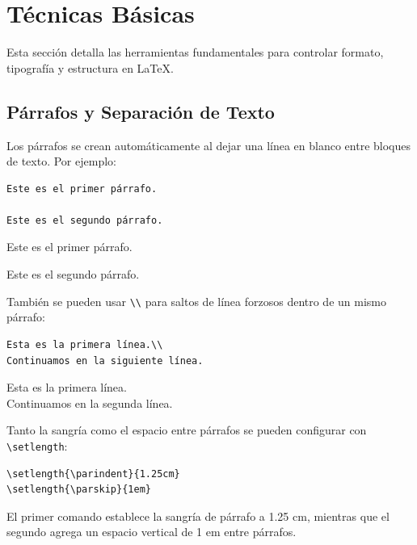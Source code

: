 \section{Técnicas Básicas}

Esta sección detalla las herramientas fundamentales para controlar formato, tipografía y estructura en \LaTeX.

\subsection{Párrafos y Separación de Texto}

Los párrafos se crean automáticamente al dejar una línea en blanco entre bloques de texto\cite{latex_project}. Por ejemplo:

\begin{verbatim}
Este es el primer párrafo.

Este es el segundo párrafo.
\end{verbatim}

\begin{tcolorbox}[title=Salida,colback=white!10,colframe=black,fonttitle=\bfseries]
Este es el primer párrafo.

Este es el segundo párrafo.
\end{tcolorbox}

También se pueden usar \texttt{\textbackslash\textbackslash} para saltos de línea forzosos dentro de un mismo párrafo:

\begin{verbatim}
Esta es la primera línea.\\
Continuamos en la siguiente línea.
\end{verbatim}

\begin{tcolorbox}[title=Salida,colback=white!10,colframe=black,fonttitle=\bfseries]
Esta es la primera línea.\\
Continuamos en la segunda línea.
\end{tcolorbox}

Tanto la sangría como el espacio entre párrafos se pueden configurar con \texttt{\textbackslash setlength}:

\begin{verbatim}
\setlength{\parindent}{1.25cm} 
\setlength{\parskip}{1em}
\end{verbatim}

El primer comando establece la sangría de párrafo a 1.25 cm, mientras que el segundo agrega un espacio vertical de 1 em entre párrafos.

